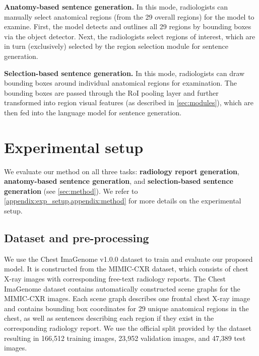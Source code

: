 \documentclass[10pt,twocolumn,letterpaper]{article}
\begin{document}
\noindent\textbf{Anatomy-based sentence generation.} In this mode, radiologists can manually select anatomical regions (from the 29 overall regions) for the model to examine. First, the model detects and outlines all 29 regions by bounding boxes via the object detector. Next, the radiologists select regions of interest, which are in turn (exclusively) selected by the region selection module for sentence generation.

\noindent\textbf{Selection-based sentence generation.} In this mode, radiologists can draw bounding boxes around individual anatomical regions for examination. The bounding boxes are passed through the RoI pooling layer and further transformed into region visual features (as described in \cref{sec:modules}), which are then fed into the language model for sentence generation.

\section{Experimental setup}

We evaluate our method on all three tasks: \textbf{radiology report generation}, \textbf{anatomy-based sentence generation}, and \textbf{selection-based sentence generation} (see \cref{sec:method}). We refer to \cref{appendix:exp_setup,appendix:method} for more details on the experimental setup.

\subsection{Dataset and pre-processing}

We use the Chest ImaGenome v1.0.0 \cite{wu2021chest, wu2021chestphysio, PhysioNet} dataset to train and evaluate our proposed model. It is constructed from the MIMIC-CXR \cite{johnson2019mimic, johnson2019mimicphysio} dataset, which consists of chest X-ray images with corresponding free-text radiology reports. The Chest ImaGenome dataset contains automatically constructed scene graphs for the MIMIC-CXR images. Each scene graph describes one frontal chest X-ray image and contains bounding box coordinates for 29 unique anatomical regions in the chest, as well as sentences describing each region if they exist in the corresponding radiology report. We use the official split provided by the dataset resulting in 166,512 training images, 23,952 validation images, and 47,389 test images.
\end{document}

